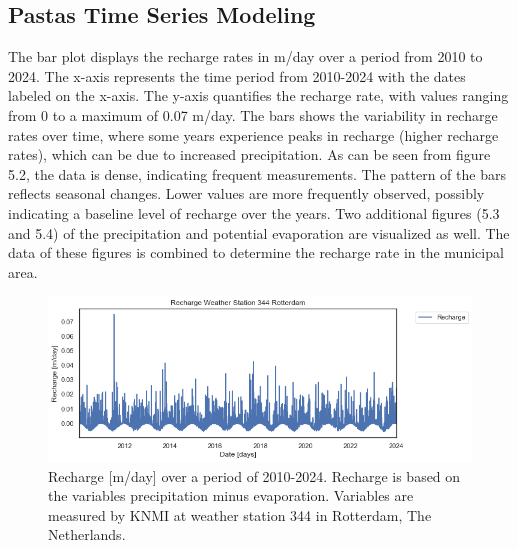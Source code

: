 \subsection{Pastas Time Series Modeling}
The bar plot displays the recharge rates in m/day over a period from 2010 to 2024. The x-axis represents the time period from 2010-2024 with the dates labeled on the x-axis. The y-axis quantifies the recharge rate, with values ranging from 0 to a maximum of 0.07 m/day. The bars shows the variability in recharge rates over time, where some years experience peaks in recharge (higher recharge rates), which can be due to increased precipitation. As can be seen from figure 5.2, the data is dense, indicating frequent measurements. The pattern of the bars reflects seasonal changes. Lower values are more frequently observed, possibly indicating a baseline level of recharge over the years. Two additional figures (5.3 and 5.4) of the precipitation and potential evaporation are visualized as well. The data of these figures is combined to determine the recharge rate in the municipal area.


\begin{figure}[htbp]
    \centering
    \includegraphics[width=0.80\linewidth]{figures/res roz/Recharge Rdam.png}
    \caption{Recharge [m/day] over a period of 2010-2024. Recharge is based on the variables precipitation minus evaporation. Variables are  measured by KNMI at weather station 344 in Rotterdam, The Netherlands.}
\end{figure}

